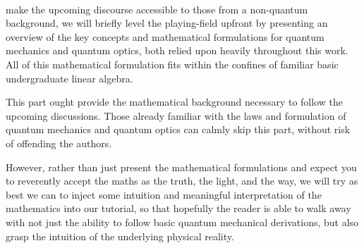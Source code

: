 \\

 make the upcoming discourse accessible to those from a non-quantum background, we will briefly level the playing-field upfront by presenting an overview of the key concepts and mathematical formulations for quantum mechanics and quantum optics, both relied upon heavily throughout this work. All of this mathematical formulation fits within the confines of familiar basic undergraduate linear algebra.

This part ought provide the mathematical background necessary to follow the upcoming discussions. Those already familiar with the laws and formulation of quantum mechanics and quantum optics can calmly skip this part, without risk of offending the authors.

However, rather than just present the mathematical formulations and expect you to reverently accept the maths as the truth, the light, and the way, we will try as best we can to inject some intuition and meaningful interpretation of the mathematics into our tutorial, so that hopefully the reader is able to walk away with not just the ability to follow basic quantum mechanical derivations, but also grasp the intuition of the underlying physical reality.